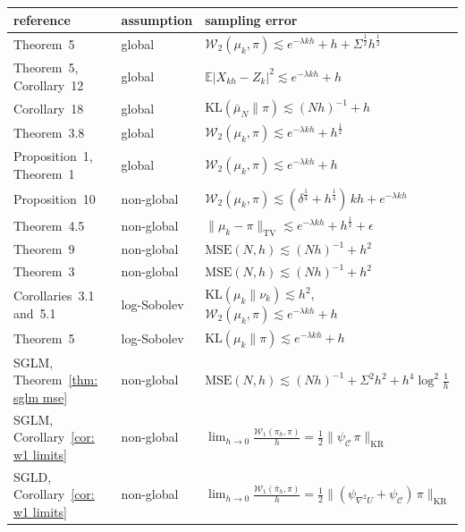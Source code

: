 \documentclass{article}
\newcommand{\MSE}{\mathrm{MSE}}
\newcommand{\norm}[1]{\lVert #1 \rVert}
\numberwithin{equation}{section}
\begin{document}
\begin{table}[htb]
	\centering
	\setlength{\tabcolsep}{4pt}
	\begingroup
	\begin{tabular}{@{}p{48mm}p{20mm}p{80mm}@{}}
		\toprule
		reference & assumption & sampling error \\
		\midrule
		Theorem~5 \citep{dalalyan2017user} & global & $\mathcal W_2(\mu_k, \pi) \lesssim e^{-\lambda kh} + h + \Sigma^{\frac12} h^{\frac12}$ \\
		Theorem~5, Corollary~12 \citep{nagapetyan2017true} & global & $\mathbb E |X_{kh} - Z_k|^2 \lesssim e^{-\lambda kh} + h$ \\
		Corollary~18 \citep{durmus2019analysis} & global & $\mathrm{KL}(\bar\mu_N \| \pi) \lesssim (Nh)^{-1} + h$ \\
		Theorem~3.8 \citep{shaw2025random} & global & $\mathcal W_2(\mu_k, \pi) \lesssim e^{-\lambda kh} + h^{\frac12}$ \\
		Proposition~1, Theorem~1 \citep{paulin2026sgld} & global & $\mathcal W_2(\mu_k, \pi) \lesssim e^{-\lambda kh} + h$ \\
		Proposition~10 \citep{raginsky2017nonconvex} & non-global & $\mathcal W_2(\mu_k, \pi) \lesssim (\delta^{\frac14} + h^{\frac14})\, kh + e^{-\lambda kh}$ \\
		Theorem~4.5 \citep{zou2021faster} & non-global & $\norm{\mu_k - \pi}_{\mathrm{TV}} \lesssim e^{-\lambda kh} + h^{\frac12} + \epsilon$ \\
		Theorem~9 \citep{vollmer2016exploration} & non-global & $\MSE(N,h) \lesssim (Nh)^{-1} + h^2$ \\
		Theorem~3 \citep{chen2015convergence} & non-global & $\MSE(N,h) \lesssim (Nh)^{-1} + h^2$ \\
		Corollaries~3.1 and~5.1 \citep{li2022sharp} & log-Sobolev & $\mathrm{KL}(\mu_k \| \nu_k) \lesssim h^2$, \ $\mathcal W_2(\mu_k, \pi) \lesssim e^{-\lambda kh} + h$ \\
		Theorem~5 \citep{das2023utilising} & log-Sobolev & $\mathrm{KL}(\mu_k \| \pi) \lesssim e^{-\lambda kh} + h$ \\
		\midrule
		SGLM, Theorem~\ref{thm: sglm mse} & non-global & $\MSE(N,h) \lesssim (Nh)^{-1} + \Sigma^2 h^2 + h^4 \log^2\frac1h$ \\
		SGLM, Corollary~\ref{cor: w1 limits} & non-global & $\lim_{h \to 0} \frac{\mathcal W_1(\pi_h, \pi)}{h} = \frac12 \norm{\psi_{\mathcal C}\, \pi}_{\mathrm{KR}}$ \\
		SGLD, Corollary~\ref{cor: w1 limits} & non-global & $\lim_{h \to 0} \frac{\mathcal W_1(\bar\pi_h, \pi)}{h} = \frac12 \norm{( \psi_{\nabla^2 U} + \psi_{\mathcal C} )\, \pi}_{\mathrm{KR}}$ \\

\end{tabular}
\end{table}
\end{document}
